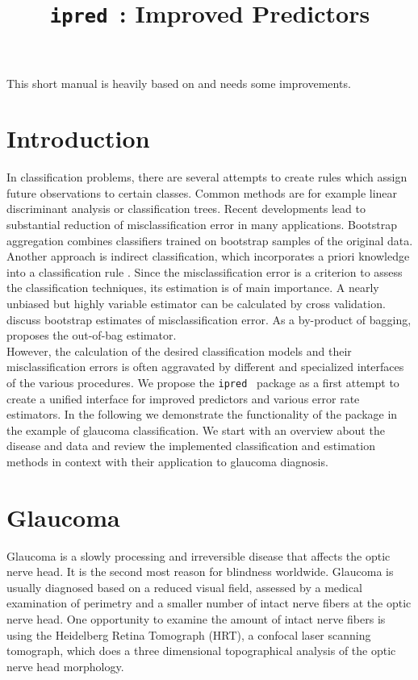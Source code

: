 \documentclass[11pt]{article}
\newcommand{\ipred}{\texttt{ipred }}
\begin{document}
\title{\ipred: Improved Predictors}
\date{}



\maketitle

This short manual is heavily based on
\cite{Rnews:Peters+Hothorn+Lausen:2002} and needs some improvements.

\section{Introduction}
In classification problems, there are several attempts to create rules which assign future observations to 
certain classes. Common methods are for 
example linear discriminant analysis or 
classification trees. Recent developments lead to substantial reduction of misclassification error 
in many applications. 
Bootstrap aggregation \citep[``bagging'',][]{breiman:1996} combines 
classifiers trained on bootstrap samples of the original data. Another
approach is indirect classification, which 
incorporates a priori knowledge 
into a classification rule \citep{hand:2001}.
Since the misclassification error is a criterion to assess the 
classification techniques, its estimation is of main importance. 
A nearly unbiased but highly variable estimator can be calculated by cross validation. \cite{efron:1997} discuss bootstrap 
estimates of misclassification error.
As a by-product of bagging, \cite{out-of-bag:1996} proposes the out-of-bag 
estimator. \\ 
However, the calculation of the desired classification models and 
their misclassification errors is often aggravated by different and
specialized interfaces of the various procedures. We propose the \ipred
package as a first attempt to create a unified interface for improved predictors and various error rate estimators. 
In the following we demonstrate the functionality of the package 
in the example of glaucoma classification. We start with an overview 
about the disease and data and review the implemented 
classification and estimation methods in context with their
application to glaucoma diagnosis.
  

\section{Glaucoma}
Glaucoma is a slowly processing and irreversible disease that affects 
the optic nerve head. It is the second most reason for blindness worldwide. 
Glaucoma is usually diagnosed based on a reduced visual field, 
assessed by a medical examination of perimetry and a smaller number of 
intact nerve fibers at the optic nerve head. One opportunity to examine 
the amount of intact nerve fibers is using the Heidelberg Retina 
Tomograph (HRT), a confocal laser scanning tomograph, which does a 
three dimensional topographical analysis of the optic nerve head morphology. 
\end{document}
